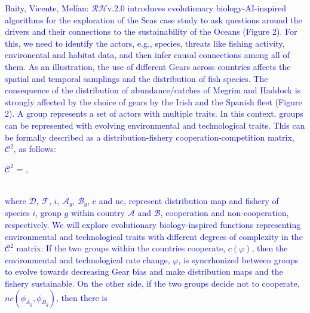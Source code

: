 \documentclass[11pt, a4paper]{article} %
\begin{document}
\textcolor{blue}{Baity, Vicente, Mel\'ian:
  $\mathcal{RH}$v.2.0 introduces evolutionary biology-AI-inspired
  algorithms for the exploration of the Seas case study to ask
  questions around the drivers and their connections to the
  sustainability of the Oceans (Figure 2). For this, we need to
  identify the actors, e.g., species, threats like fishing activity,
  environental and habitat data, and then infer causal connections
  among all of them. As an illustration, the use of different Gears
  across countries affects the spatial and temporal samplings and the
  distribution of fish species. The consequence of the distribution of
  abundance/catches of Megrim and Haddock is strongly affected by the
  choice of gears by the Irish and the Spanish fleet (Figure 2). A
  group represents a set of actors with multiple traits. In this
  context, groups can be represented with evolving environmental and
  technological traits. This can be formally described as a
  distribution-fishery cooperation-competition matrix,
  $\mathcal{C}^{2}$, as follows:
  \vspace{0.1 in}\\
\begin{center}
  $\mathcal{C}^2$ = , \vspace{0.2 in}
\end{center}
\\
where $\mathcal{D}$, $\mathcal{F}$, $i$, $\mathcal{A}_{g}$,
$\mathcal{B}_{g}$, c and nc, represent distribution map and fishery of
species $i$, group $g$ within country $\mathcal{A}$ and $\mathcal{B}$,
cooperation and non-cooperation, respectively. We will explore
evolutionary biology-inspired functions representing environmental and
technological traits with different degrees of complexity in the
$\mathcal{C}^2$ matrix: If the two groups within the countries
cooperate, $c(\varphi)$, then the environmental and technological rate
change, $\varphi$, is syncrhonized between groups to evolve towards
decreasing Gear bias and make distribution maps and the fishery
sustainable. On the other side, if the two groups decide not to
cooperate, $nc(\phi_{A_{g}},\phi_{B_{g}})$, then there is
}
\end{document}
